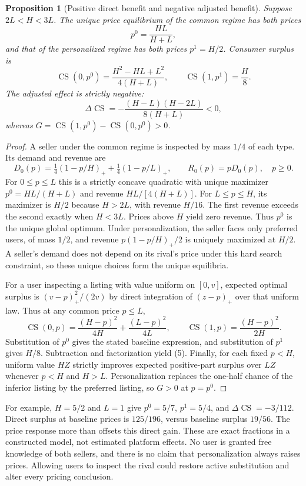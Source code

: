 \documentclass[11pt]{article}
\newtheorem{proposition}[theorem]{Proposition}
\theoremstyle{remark}
\newcommand{\CS}{\operatorname{CS}}
\begin{document}
\begin{proposition}[Positive direct benefit and negative adjusted benefit]
Suppose $2L<H<3L$. The unique price equilibrium of the common regime has both prices
\[
 p^0=\frac{HL}{H+L},
\]
and that of the personalized regime has both prices $p^1=H/2$. Consumer surplus is
\[
 \CS(0,p^0)=\frac{H^2-HL+L^2}{4(H+L)},\qquad
 \CS(1,p^1)=\frac H8.
\]
The adjusted effect is strictly negative:
\[
 \Delta\CS=-\frac{(H-L)(H-2L)}{8(H+L)}<0,              \tag{5}
\]
whereas $G=\CS(1,p^0)-\CS(0,p^0)>0$.
\end{proposition}
\begin{proof}
A seller under the common regime is inspected by mass $1/4$ of each type. Its demand and revenue are
\[
 D_0(p)=\tfrac14(1-p/H)_++\tfrac14(1-p/L)_+,
 \qquad R_0(p)=pD_0(p),\quad p\geq0.
\]
For $0\leq p\leq L$ this is a strictly concave quadratic with unique maximizer $p^0=HL/(H+L)$ and revenue $HL/[4(H+L)]$. For $L\leq p\leq H$, its maximizer is $H/2$ because $H>2L$, with revenue $H/16$. The first revenue exceeds the second exactly when $H<3L$. Prices above $H$ yield zero revenue. Thus $p^0$ is the unique global optimum. Under personalization, the seller faces only preferred users, of mass $1/2$, and revenue $p(1-p/H)_+/2$ is uniquely maximized at $H/2$. A seller's demand does not depend on its rival's price under this hard search constraint, so these unique choices form the unique equilibria.

For a user inspecting a listing with value uniform on $[0,v]$, expected optimal surplus is $(v-p)_+^2/(2v)$ by direct integration of $(z-p)_+$ over that uniform law. Thus at any common price $p\leq L$,
\[
 \CS(0,p)=\frac{(H-p)^2}{4H}+\frac{(L-p)^2}{4L},\qquad
 \CS(1,p)=\frac{(H-p)^2}{2H}.
\]
Substitution of $p^0$ gives the stated baseline expression, and substitution of $p^1$ gives $H/8$. Subtraction and factorization yield (5). Finally, for each fixed $p<H$, uniform value $HZ$ strictly improves expected positive-part surplus over $LZ$ whenever $p<H$ and $H>L$. Personalization replaces the one-half chance of the inferior listing by the preferred listing, so $G>0$ at $p=p^0$.
\end{proof}

For example, $H=5/2$ and $L=1$ give $p^0=5/7$, $p^1=5/4$, and $\Delta\CS=-3/112$. Direct surplus at baseline prices is $125/196$, versus baseline surplus $19/56$. The price response more than offsets this direct gain. These are exact fractions in a constructed model, not estimated platform effects. No user is granted free knowledge of both sellers, and there is no claim that personalization always raises prices. Allowing users to inspect the rival could restore active substitution and alter every pricing conclusion.
\end{document}
